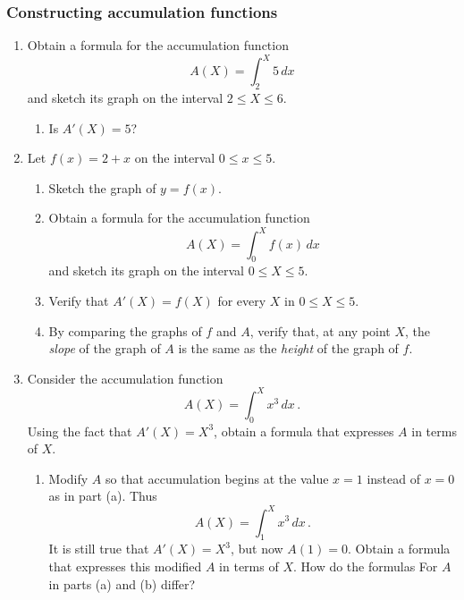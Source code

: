 \subsubsection{Constructing accumulation functions}
\label{subsubsec:constructing-accumulation-functions}



\enlargethispage*{20pt}

\begin{enumerate}
\item Obtain a formula for the accumulation function
	\[
A(X) = \int_2^X 5 \, dx
\]
and sketch its graph on the interval $2 \leq X \leq 6$.

  \begin{enumerate}
  \item Is $A'(X) = 5$?



\end{enumerate}
\item Let $f(x) = 2 + x$ on the interval $0 \leq x \leq 5$.

  \begin{enumerate}
  \item Sketch the graph of $y = f(x)$.

  \item Obtain a formula for the accumulation function
	\[
A(X) = \int_0^X f(x) \, dx
\]
and sketch its graph on the interval $0 \leq X \leq 5$.

  \item Verify that $A'(X) = f(X)$ for every $X$ in $0 \leq X \leq 5$.

  \item By comparing the graphs of $f$ and $A$, verify that, at any point
$X$, the {\em slope\/} of the graph of $A$ is the same as the {\em
  height\/} of the graph of $f$.



\end{enumerate}
\item Consider the accumulation function
	\[
A(X) = \int_0^X x^3 \, dx \, .
\]
Using the fact that $A'(X) = X^3$, obtain a formula that expresses $A$ in terms of $X$.

  \begin{enumerate}
  \item Modify $A$ so that accumulation begins at the value $x = 1$ instead of $x = 0$ as in part (a).  Thus
	\[
A(X) = \int_1^X x^3 \, dx \, .
\]
It is still true that $A'(X) = X^3$, but now $A(1) = 0$.  Obtain a formula that expresses this modified $A$ in terms of $X$.  How do the formulas For $A$ in parts (a) and (b) differ?


\end{enumerate}
\end{enumerate}

